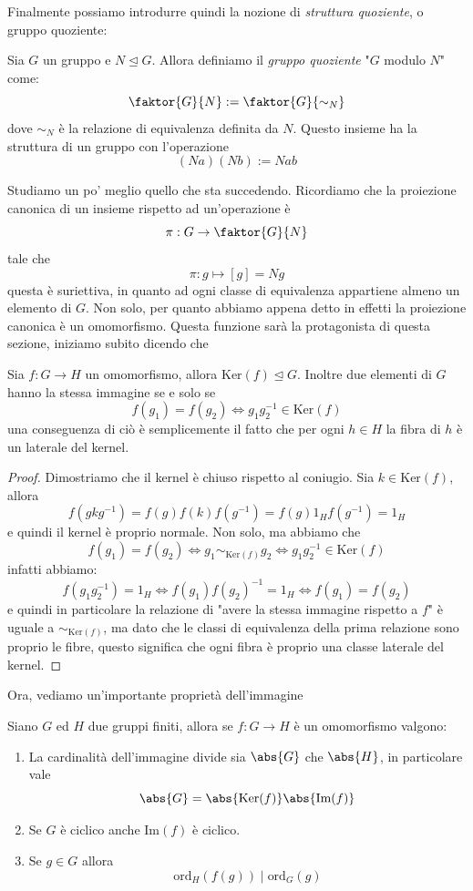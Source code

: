 \documentclass[11pt]{scrartcl}
\newcommand{\Immagine}[1]{\text{Im}\!\left(#1\right)}
\renewcommand{\ker}[1]{\text{Ker}\!\left(#1\right)}
\newcommand{\ordine}[2]{\text{ord}_{#1}\left(#2\right)}
\newcommand{\normal}{\mathrel{\unlhd}}
\begin{document}
	Finalmente possiamo introdurre quindi la nozione di \textit{struttura quoziente}, o gruppo quoziente:
	\begin{definition}
		Sia $G$ un gruppo e $N\normal G$. Allora definiamo il \textit{gruppo quoziente} "$G$ modulo $N$" come:
		$$\faktor{G}{N}:=\faktor{G}{\sim_N}$$ 
		dove $\sim_N$ è la relazione di equivalenza definita da $N$. Questo insieme ha la struttura di un gruppo con l'operazione
		$$(Na)(Nb):=Nab$$
	\end{definition} 
	
	Studiamo un po' meglio quello che sta succedendo. Ricordiamo che la proiezione canonica di un insieme rispetto ad un'operazione è 
	$$\pi:G\to \faktor{G}{N}$$
	tale che 
	$$\pi:g\mapsto [g]=Ng$$
	questa è suriettiva, in quanto ad ogni classe di equivalenza appartiene almeno un elemento di $G$. Non solo, per quanto abbiamo appena detto in effetti la proiezione canonica è un omomorfismo. Questa funzione sarà la protagonista di questa sezione, iniziamo subito dicendo che 
	\begin{lemma}
		Sia $f:G\to H$ un omomorfismo, allora $\ker{f}\normal G$. Inoltre due elementi di $G$ hanno la stessa immagine se e solo se 
		$$f(g_1)=f(g_2) \iff g_1g_2^{-1}\in \ker {f}$$
		una conseguenza di ciò è semplicemente il fatto che per ogni $h\in H$ la fibra di $h$ è un laterale del kernel.
	\end{lemma}
	\begin{proof}
		Dimostriamo che il kernel è chiuso rispetto al coniugio. Sia $k\in \ker {f}$, allora
		$$f(gkg^{-1})=f(g)f(k)f(g^{-1})=f(g)1_Hf(g^{-1})=1_H$$
		e quindi il kernel è proprio normale. Non solo, ma abbiamo che 
		$$f(g_1)=f(g_2)\iff g_1\sim_{\ker {f}}g_2 \iff g_1g_2^{-1}\in \ker {f}$$
		infatti abbiamo:
		$$f(g_1g_2^{-1})=1_H \iff f(g_1)f(g_2)^{-1}=1_H \iff f(g_1)=f(g_2)$$
		e quindi in particolare la relazione di "avere la stessa immagine rispetto a $f$" è uguale a $\sim_{\ker {f}}$, ma dato che le classi di equivalenza della prima relazione sono proprio le fibre, questo significa che ogni fibra è proprio una classe laterale del kernel.
	\end{proof}
	Ora, vediamo un'importante proprietà dell'immagine 
	\begin{lemma}
		Siano $G$ ed $H$ due gruppi finiti, allora se $f:G\to H$ è un omomorfismo valgono:
		\begin{enumerate}
			\item La cardinalità dell'immagine divide sia $\abs{G}$ che $\abs{H}$, in particolare vale
			$$\abs{G}=\abs{\ker{f}}\abs{\Immagine{f}}$$ 
			\item Se $G$ è ciclico anche $\Immagine{f}$ è ciclico.
			\item Se $g\in G$ allora
			$$\ordine{H}{f(g)}\mid \ordine{G}{g}$$
		\end{enumerate} 
	\end{lemma}
\end{document}
